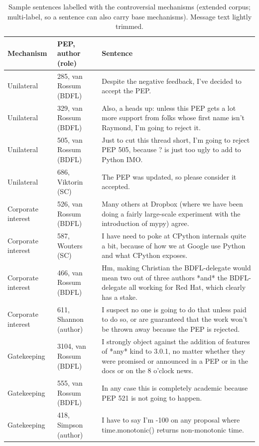 \begin{table}[t]
\caption{Sample sentences labelled with the controversial mechanisms (extended corpus; multi-label, so a sentence can also carry base mechanisms). Message text lightly trimmed.}
\label{tab:rq6examples}
\small
\begin{tabular}{p{}p{}p{}}
\toprule
Mechanism & PEP, author (role) & Sentence \\
\midrule
Unilateral & 285, van Rossum (BDFL) & Despite the negative feedback, I've decided to accept the PEP. \\
Unilateral & 329, van Rossum (BDFL) & Also, a heads up: unless this PEP gets a lot more support from folks whose first name isn't Raymond, I'm going to reject it. \\
Unilateral & 505, van Rossum (BDFL) & Just to cut this thread short, I'm going to reject PEP 505, because ? is just too ugly to add to Python IMO. \\
Unilateral & 686, Viktorin (SC) & The PEP was updated, so please consider it accepted. \\
Corporate interest & 526, van Rossum (BDFL) & Many others at Dropbox (where we have been doing a fairly large-scale experiment with the introduction of mypy) agree. \\
Corporate interest & 587, Wouters (SC) & I have need to poke at CPython internals quite a bit, because of how we at Google use Python and what CPython exposes. \\
Corporate interest & 466, van Rossum (BDFL) & Hm, making Christian the BDFL-delegate would mean two out of three authors *and* the BDFL-delegate all working for Red Hat, which clearly has a stake. \\
Corporate interest & 611, Shannon (author) & I suspect no one is going to do that unless paid to do so, or are guaranteed that the work won't be thrown away because the PEP is rejected. \\
Gatekeeping & 3104, van Rossum (BDFL) & I strongly object against the addition of features of *any* kind to 3.0.1, no matter whether they were promised or announced in a PEP or in the docs or on the 8 o'clock news. \\
Gatekeeping & 555, van Rossum (BDFL) & In any case this is completely academic because PEP 521 is not going to happen. \\
Gatekeeping & 418, Simpson (author) & I have to say I'm -100 on any proposal where time.monotonic() returns non-monotonic time. \\

\end{tabular}
\end{table}
